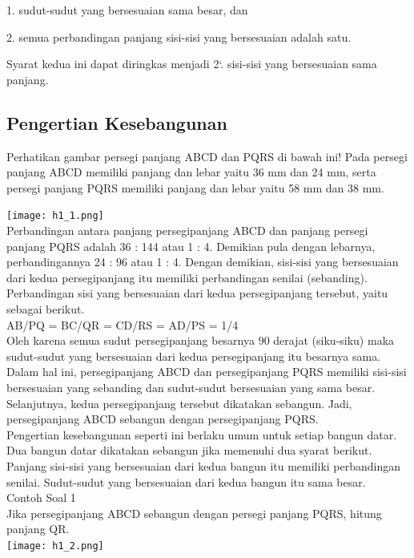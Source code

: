 \documentclass[11pt,fleqn]{book} %
\begin{document}
1. sudut-sudut yang bersesuaian sama besar, dan

2. semua perbandingan panjang sisi-sisi yang bersesuaian adalah satu.

Syarat kedua ini dapat diringkas menjadi 2`. sisi-sisi yang bersesuaian sama panjang. 


\subsection{Pengertian Kesebangunan}

Perhatikan gambar persegi panjang ABCD dan PQRS di bawah ini! Pada persegi panjang ABCD memiliki panjang dan lebar yaitu 36 mm dan 24 mm, serta persegi panjang PQRS memiliki panjang dan lebar yaitu 58 mm dan 38 mm.

 \texttt{[image: h1\_1.png]}\\
 
Perbandingan antara panjang persegipanjang ABCD dan panjang persegi panjang PQRS adalah 36 : 144 atau 1 : 4. Demikian pula dengan lebarnya, perbandingannya 24 : 96 atau 1 : 4. Dengan demikian, sisi-sisi yang bersesuaian dari kedua persegipanjang itu memiliki perbandingan senilai (sebanding). Perbandingan sisi yang bersesuaian dari kedua persegipanjang tersebut, yaitu sebagai berikut.\\
AB/PQ = BC/QR = CD/RS = AD/PS = 1/4\\

Oleh karena semua sudut persegipanjang besarnya 90 derajat (siku-siku) maka sudut-sudut yang bersesuaian dari kedua persegipanjang itu besarnya sama. Dalam hal ini, persegipanjang ABCD dan persegipanjang PQRS memiliki sisi-sisi bersesuaian yang sebanding dan sudut-sudut bersesuaian yang sama besar. Selanjutnya, kedua persegipanjang tersebut dikatakan sebangun. Jadi, persegipanjang ABCD sebangun dengan persegipanjang PQRS.\\

Pengertian kesebangunan seperti ini berlaku umum untuk setiap bangun datar. Dua bangun datar dikatakan sebangun jika memenuhi dua syarat berikut.\\

Panjang sisi-sisi yang bersesuaian dari kedua bangun itu memiliki perbandingan senilai.
Sudut-sudut yang bersesuaian dari kedua bangun itu sama besar.\\


Contoh Soal 1\\
Jika persegipanjang ABCD sebangun dengan persegi panjang PQRS, hitung panjang QR.\\
 \texttt{[image: h1\_2.png]}\\
 
\end{document}

